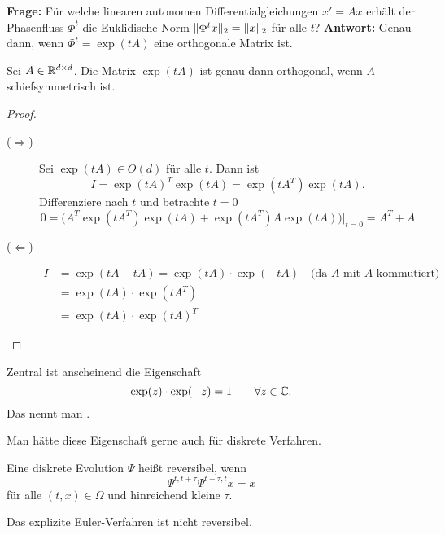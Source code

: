 \textbf{Frage:} Für welche linearen autonomen Differentialgleichungen $x' = Ax$ erhält der Phasenfluss $\Phi^t$ die Euklidische Norm $\lVert \Phi^t x \rVert_2 = \lVert x \rVert_2$ für alle $t$?
\textbf{Antwort:} Genau dann, wenn $\Phi^t = \exp(tA)$ eine orthogonale Matrix ist.
\begin{satz}
\label{thm:normerhaltende_fluesse}
	Sei $A\in\mathbb R^{d \times d}$. Die Matrix $\exp(tA)$ ist genau dann orthogonal,
	wenn $A$ schiefsymmetrisch ist.
\end{satz}
\begin{proof}
	\begin{description}
		\item[($\boldsymbol{\Rightarrow}$)] Sei $\exp(tA)\in O(d)$ für alle $t$.
		Dann ist
		\begin{equation*}
			I = \exp(tA)^T \exp(tA) = \exp(tA^T) \exp(tA).
		\end{equation*}
		Differenziere nach $t$ und betrachte $t=0$
		\begin{equation*}
			0=\Big(A^T \exp(tA^T) \exp(tA) + \exp(tA^T)A \exp(tA) \Big)\Big|_{t=0} = A^T+A
		\end{equation*}
		\item[($\boldsymbol{\Leftarrow}$)] 
		\begin{align*}
			I
			&= \exp(tA-tA) = \exp(tA)\cdot \exp(-tA)\quad\text{(da $A$ mit $A$ kommutiert)}\\
			&= \exp(tA)\cdot \exp(tA^T) \\
			&= \exp(tA)\cdot \exp(tA)^T	 
		\end{align*}
	\end{description}
\end{proof}

Zentral ist anscheinend die Eigenschaft
\begin{equation*}
	\exp(z)\cdot \exp(-z) = 1\qquad \forall z\in\mathbb C.
\end{equation*}
Das nennt man .

Man hätte diese Eigenschaft gerne auch für diskrete Verfahren.
\begin{definition}
	Eine diskrete Evolution $\Psi$ heißt reversibel, wenn
	\begin{equation*}
		\Psi^{t,t+\tau}\Psi^{t+\tau,t} x = x
	\end{equation*}
	für alle $(t,x)\in\Omega$ und hinreichend kleine $\tau$.
\end{definition}

\begin{bsp}
	Das explizite Euler-Verfahren ist nicht reversibel.
\end{bsp}

